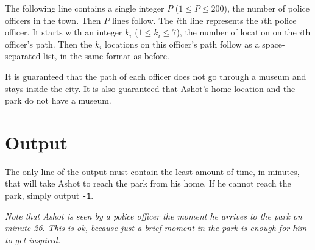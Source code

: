 The following line contains a single integer $P$ ($1 \leq P \leq 200$), the number of police officers in the town.
Then $P$ lines follow.
The $i$th line represents the $i$th police officer.
It starts with an integer $k_i$ ($1 \leq k_i \leq 7$), the number of location on the $i$th officer's path.
Then the $k_i$ locations on this officer's path follow as a space-separated list, in the same format as before.

It is guaranteed that the path of each officer does not go through a museum and stays inside the city.
It is also guaranteed that Ashot's home location and the park do not have a museum.

\section*{Output}
The only line of the output must contain the least amount of time, in minutes, that will take Ashot to reach the park from his home.
If he cannot reach the park, simply output \texttt{-1}.
{
\emph{Note that Ashot is seen by a police officer the moment he arrives to the park on minute 26.
This is ok, because just a brief moment in the park is enough for him to get inspired.}

}
